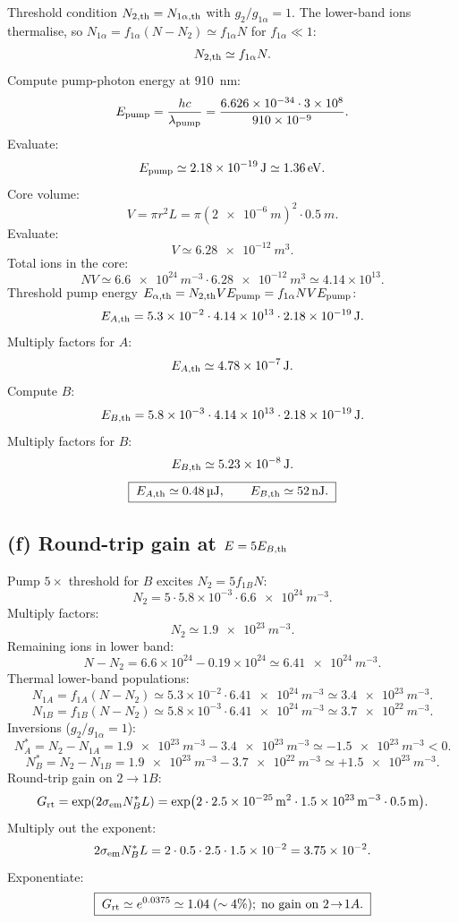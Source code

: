 \documentclass[11pt]{article}
\begin{document}
Threshold condition $N_{2,\rm th}=N_{1\alpha,\rm th}$ with $g_{2}/g_{1\alpha}=1$. The lower-band ions thermalise, so $N_{1\alpha}=f_{1\alpha}(N-N_2)\simeq f_{1\alpha}N$ for $f_{1\alpha}\ll 1$:
\[
N_{2,\rm th}\simeq f_{1\alpha}N.
\]
Compute pump-photon energy at \SI{910}{nm}:
\[
E_{\rm pump}=\frac{hc}{\lambda_{\rm pump}}=\frac{6.626\times 10^{-34}\cdot 3\times 10^{8}}{910\times 10^{-9}}.
\]
Evaluate:
\[
E_{\rm pump}\simeq\SI{2.18e-19}{J}\simeq\SI{1.36}{eV}.
\]
Core volume:
\[
V=\pi r^{2}L=\pi(\SI{2e-6}{m})^{2}\cdot\SI{0.5}{m}.
\]
Evaluate:
\[
V\simeq\SI{6.28e-12}{m^{3}}.
\]
Total ions in the core:
\[
NV\simeq\SI{6.6e24}{m^{-3}}\cdot\SI{6.28e-12}{m^{3}}\simeq 4.14\times 10^{13}.
\]
Threshold pump energy $E_{\alpha,\rm th}=N_{2,\rm th}V E_{\rm pump}=f_{1\alpha}NV E_{\rm pump}$:
\[
E_{A,\rm th}=5.3\times 10^{-2}\cdot 4.14\times 10^{13}\cdot\SI{2.18e-19}{J}.
\]
Multiply factors for $A$:
\[
E_{A,\rm th}\simeq\SI{4.78e-7}{J}.
\]
Compute $B$:
\[
E_{B,\rm th}=5.8\times 10^{-3}\cdot 4.14\times 10^{13}\cdot\SI{2.18e-19}{J}.
\]
Multiply factors for $B$:
\[
E_{B,\rm th}\simeq\SI{5.23e-8}{J}.
\]
\begin{equation}
\boxed{\;E_{A,\rm th}\simeq\SI{0.48}{\micro J},\qquad E_{B,\rm th}\simeq\SI{52}{nJ}.\;}
\label{eq:Eth-results}
\end{equation}

\subsection*{(f) Round-trip gain at $E=5E_{B,\rm th}$}

Pump $5\times$ threshold for $B$ excites $N_2=5 f_{1B}N$:
\[
N_2=5\cdot 5.8\times 10^{-3}\cdot\SI{6.6e24}{m^{-3}}.
\]
Multiply factors:
\[
N_2\simeq\SI{1.9e23}{m^{-3}}.
\]
Remaining ions in lower band:
\[
N-N_2=6.6\times 10^{24}-0.19\times 10^{24}\simeq\SI{6.41e24}{m^{-3}}.
\]
Thermal lower-band populations:
\[
N_{1A}=f_{1A}(N-N_2)\simeq 5.3\times 10^{-2}\cdot\SI{6.41e24}{m^{-3}}\simeq\SI{3.4e23}{m^{-3}}.
\]
\[
N_{1B}=f_{1B}(N-N_2)\simeq 5.8\times 10^{-3}\cdot\SI{6.41e24}{m^{-3}}\simeq\SI{3.7e22}{m^{-3}}.
\]
Inversions ($g_2/g_{1\alpha}=1$):
\[
N^{*}_{A}=N_2-N_{1A}=\SI{1.9e23}{m^{-3}}-\SI{3.4e23}{m^{-3}}\simeq -\SI{1.5e23}{m^{-3}}<0.
\]
\[
N^{*}_{B}=N_2-N_{1B}=\SI{1.9e23}{m^{-3}}-\SI{3.7e22}{m^{-3}}\simeq +\SI{1.5e23}{m^{-3}}.
\]
Round-trip gain on $2\to 1B$:
\[
G_{\rm rt}=\exp(2\sigma_{\rm em}N^{*}_{B}L)=\exp(2\cdot\SI{2.5e-25}{m^2}\cdot\SI{1.5e23}{m^{-3}}\cdot\SI{0.5}{m}).
\]
Multiply out the exponent:
\[
2\sigma_{\rm em}N^{*}_{B}L=2\cdot 0.5\cdot 2.5\cdot 1.5\times 10^{-2}=3.75\times 10^{-2}.
\]
Exponentiate:
\begin{equation}
\boxed{\;G_{\rm rt}\simeq e^{0.0375}\simeq 1.04\;(\sim 4\%);\;\text{no gain on }2\!\to\!1A.\;}
\label{eq:Grt-num}
\end{equation}
\end{document}
